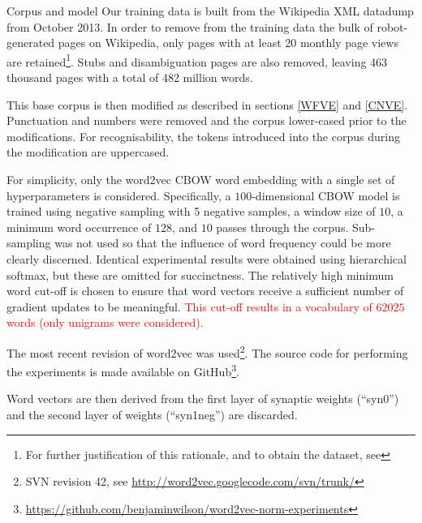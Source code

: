 \documentclass{article} %
\begin{document}
\begin{section}{Corpus and model}\label{corpus-and-model}
Our training data is built from the Wikipedia XML datadump from October 2013.
In order to remove from the training data the bulk of robot-generated pages on Wikipedia, only pages with at least 20 monthly page views are retained\footnote{For further justification of this rationale, and to obtain the dataset, see \blogpost}.
Stubs and disambiguation pages are also removed, leaving 463 thousand pages with a total of 482 million words.

This base corpus is then modified as described in sections \ref{WFVE} and \ref{CNVE}.
Punctuation and numbers were removed and the corpus lower-cased prior to the modifications.
For recognisability, the tokens introduced into the corpus during the modification are uppercased.

For simplicity, only the word2vec CBOW word embedding with a single set of hyperparameters is considered.
Specifically, a $100$-dimensional CBOW model is trained using negative sampling with 5 negative samples, a window size of $10$, a minimum word occurrence of $128$, and $10$ passes through the corpus.
Sub-sampling was not used so that the influence of word frequency could be more clearly discerned.
Identical experimental results were obtained using hierarchical softmax, but these are omitted for succinctness.
The relatively high minimum word cut-off is chosen to ensure that word vectors receive a sufficient number of gradient updates to be meaningful.
\textcolor{red}{This cut-off results in a vocabulary of $62025$ words (only unigrams were considered).}

The most recent revision of word2vec was used\footnote{SVN revision 42, see \url{http://word2vec.googlecode.com/svn/trunk/}}.
The source code for performing the experiments is made available on GitHub\footnote{\url{https://github.com/benjaminwilson/word2vec-norm-experiments}}.

Word vectors are then derived from the first layer of synaptic weights (``syn0'') and the second layer of weights (``syn1neg'') are discarded.



\end{section}
\end{document}
